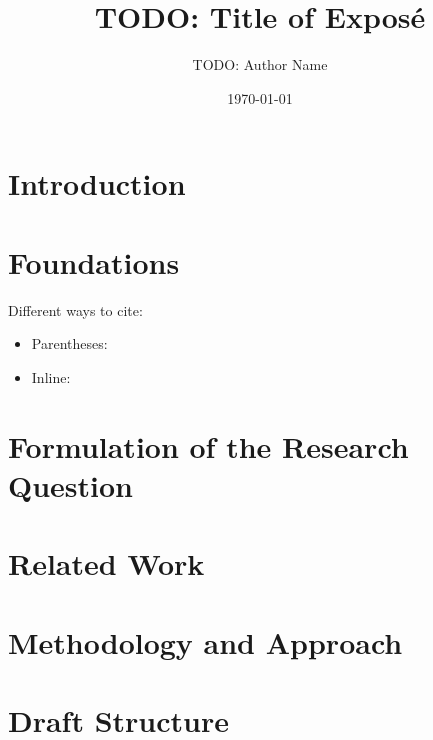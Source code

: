 \documentclass{scrartcl}
\title{TODO: Title of Exposé}
\author{TODO: Author Name}
\date{\today}
\begin{document}
\maketitle


\section{Introduction}\label{sec:introduction}


\section{Foundations}\label{sec:foundations}
Different ways to cite:
\begin{itemize}
    \item Parentheses: \autocite{Mikolov2013EfficientEstimationWord}
    \item Inline: \textcite{Mikolov2013EfficientEstimationWord}
\end{itemize}


\section{Formulation of the Research Question}\label{sec:research-question}


\section{Related Work}\label{sec:related-work}


\section{Methodology and Approach}\label{sec:methodology}


\section{Draft Structure}\label{sec:draft}
\end{document}
